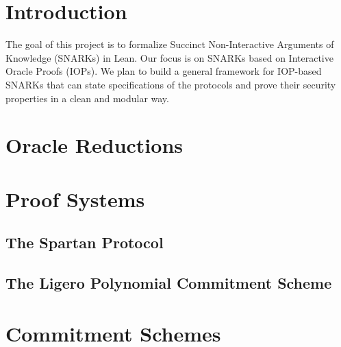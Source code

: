 %

\chapter{Introduction}

The goal of this project is to formalize Succinct Non-Interactive Arguments of Knowledge (SNARKs) in Lean. Our focus is on SNARKs based on Interactive Oracle Proofs (IOPs). We plan to build a general framework for IOP-based SNARKs that can state specifications of the protocols and prove their security properties in a clean and modular way.

\chapter{Oracle Reductions}





\chapter{Proof Systems}



\section{The Spartan Protocol}

\section{The Ligero Polynomial Commitment Scheme}

\chapter{Commitment Schemes}

